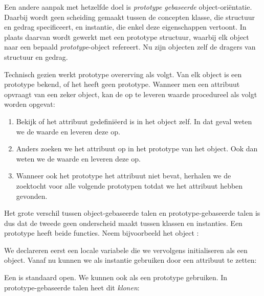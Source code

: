 Een andere aanpak met hetzelfde doel is \emph{prototype gebaseerde} object-oriëntatie. Daarbij wordt geen scheiding gemaakt tussen de concepten klasse, die structuur en gedrag specificeert, en instantie, die enkel deze eigenschappen vertoont. In plaats daarvan wordt gewerkt met een prototype structuur, waarbij elk object naar een bepaald \emph{prototype}-object refereert. Nu zijn objecten zelf de dragers van structuur en gedrag.

Technisch gezien werkt prototype overerving als volgt. Van elk object is een prototype bekend, of het heeft geen prototype. Wanneer men een attribuut opvraagt van een zeker object, kan de op te leveren waarde procedureel als volgt worden opgevat:

\begin{enumerate}
  \item Bekijk of het attribuut gedefiniëerd is in het object zelf. In dat geval weten we de waarde en leveren deze op.
  \item Anders zoeken we het attribuut op in het prototype van het object. Ook dan weten we de waarde en leveren deze op.
  \item Wanneer ook het prototype het attribuut niet bevat, herhalen we de zoektocht voor alle volgende prototypen totdat we het attribuut hebben gevonden.
\end{enumerate}

Het grote verschil tussen object-gebaseerde talen en prototype-gebaseerde talen is dus dat de tweede geen onderscheid maakt tussen klassen en instanties. Een prototype heeft beide functies. Neem bijvoorbeeld het object :

\newCodeFragment


We declareren eerst een locale variabele die we vervolgens initialiseren als een object. Vanaf nu kunnen we  als instantie gebruiken door een attribuut te zetten:


Een  is standaard open. We kunnen  ook als een prototype gebruiken. In prototype-gebaseerde talen heet dit \emph{klonen}:


